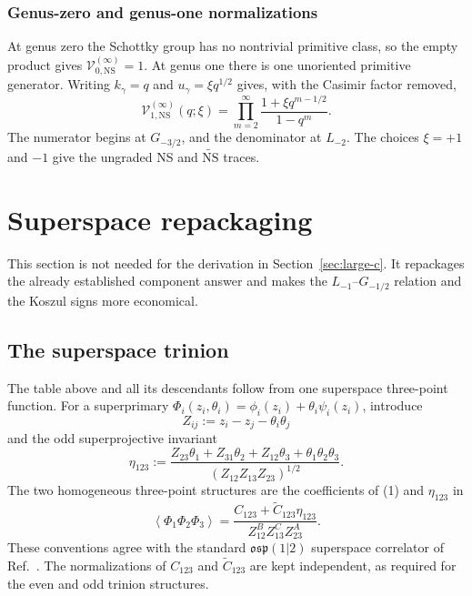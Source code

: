 \documentclass[11pt]{article}
\newcommand{\NS}{\mathrm{NS}}
\newcommand{\osp}{\mathfrak{osp}(1|2)}
\newcommand{\V}{\mathcal V}
\begin{document}
\subsubsection{Genus-zero and genus-one normalizations}

At genus zero the Schottky group has no nontrivial primitive class, so the
empty product gives \(\V_{0,\NS}^{(\infty)}=1\).  At genus one there is one
unoriented primitive generator.  Writing
\(k_\gamma=q\) and \(u_\gamma=\xi q^{1/2}\) gives, with the Casimir factor
removed,
\begin{equation}
 \V_{1,\NS}^{(\infty)}(q;\xi)
 =\prod_{m=2}^{\infty}
  \frac{1+\xi q^{m-1/2}}{1-q^m}.
 \label{eq:torus-vacuum-character}
\end{equation}
The numerator begins at \(G_{-3/2}\), and the denominator at \(L_{-2}\).
The choices \(\xi=+1\) and \(-1\) give the ungraded NS and
\(\widetilde{\NS}\) traces.

\section{Superspace repackaging}
\label{sec:superspace-repackaging}

This section is not needed for the derivation in
Section~\ref{sec:large-c}.  It repackages the already established component
answer and makes the \(L_{-1}\)--\(G_{-1/2}\) relation and the Koszul signs
more economical.

\subsection{The superspace trinion}
\label{sec:osp-superspace-vertex}

The table above and all its descendants follow from one superspace
three-point function.  For a superprimary
\(\Phi_i(z_i,\theta_i)=\phi_i(z_i)+\theta_i\psi_i(z_i)\), introduce
\begin{equation}
 Z_{ij}:=z_i-z_j-\theta_i\theta_j
 \label{eq:superdistance}
\end{equation}
and the odd superprojective invariant
\begin{equation}
 \eta_{123}:=
 \frac{Z_{23}\theta_1+Z_{31}\theta_2+Z_{12}\theta_3
       +\theta_1\theta_2\theta_3}
 {(Z_{12}Z_{13}Z_{23})^{1/2}}.
 \label{eq:odd-three-point-invariant}
\end{equation}
The two homogeneous three-point structures are the coefficients of (1)
and \(\eta_{123}\) in
\begin{equation}
 \left\langle\Phi_1\Phi_2\Phi_3\right\rangle
 =\frac{C_{123}+\widetilde C_{123}\eta_{123}}
 {Z_{12}^{B}Z_{13}^{C}Z_{23}^{A}}.
 \label{eq:superspace-three-point-function}
\end{equation}
These conventions agree with the standard \(\osp\) superspace correlator
of Ref.~\cite{BelavinRamosCabezas2022WilsonLines}.  The normalizations of
\(C_{123}\) and \(\widetilde C_{123}\) are kept independent, as required
for the even and odd trinion structures.
\end{document}
